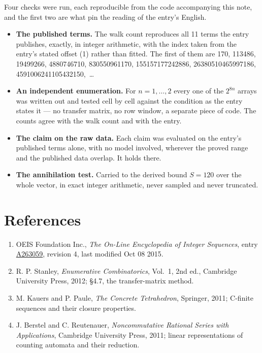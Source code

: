 \documentclass[11pt]{article}
\theoremstyle{definition}
\begin{document}
Four checks were run, each reproducible from the code accompanying this note, and the first two are what pin the reading of the entry's English.

\begin{itemize}

\item {\bfseries The published terms.} The walk count reproduces all 11 terms the entry publishes, exactly, in integer arithmetic, with the index taken from the entry's stated offset (1) rather than fitted. The first of them are 170, 113486, 19499266, 4880746710, 830550961170, 155157177242886, 26380510465997186, 4591006241105432150,~\dots

\item {\bfseries An independent enumeration.} For $n = 1,\dots,2$ every one of the $2^{8n}$ arrays was written out and tested cell by cell against the condition as the entry states it --- no transfer matrix, no row window, a separate piece of code. The counts agree with the walk count and with the entry.

\item {\bfseries The claim on the raw data.} Each claim was evaluated on the entry's published terms alone, with no model involved, wherever the proved range and the published data overlap. It holds there.

\item {\bfseries The annihilation test.} Carried to the derived bound $S = 120$ over the whole vector, in exact integer arithmetic, never sampled and never truncated.

\end{itemize}

\section{References}

\begin{enumerate}

\item OEIS Foundation Inc., \emph{The On-Line Encyclopedia of Integer Sequences}, entry \href{https://oeis.org/A263059}{A263059}, revision 4, last modified Oct 08 2015.

\item R. P. Stanley, \emph{Enumerative Combinatorics}, Vol.~1, 2nd ed., Cambridge University Press, 2012; \S4.7, the transfer-matrix method.

\item M. Kauers and P. Paule, \emph{The Concrete Tetrahedron}, Springer, 2011; C-finite sequences and their closure properties.

\item J. Berstel and C. Reutenauer, \emph{Noncommutative Rational Series with Applications}, Cambridge University Press, 2011; linear representations of counting automata and their reduction.

\end{enumerate}
\end{document}
